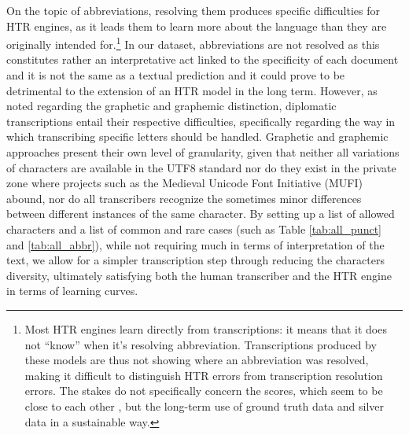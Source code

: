 \documentclass{article}
\begin{document}
On the topic of abbreviations, resolving them produces specific difficulties for HTR engines, as it leads them to learn more about the language than they are originally intended for.\footnote{Most HTR engines learn directly from transcriptions: it means that it does not \enquote{know} when it's resolving abbreviation. Transcriptions produced by these models are thus not showing where an abbreviation was resolved, making it difficult to distinguish HTR errors from transcription resolution errors. The stakes do not specifically concern the scores, which seem to be close to each other \citep{camps2021handling}, but the long-term use of ground truth data and silver data in a sustainable way.} In our dataset, abbreviations are not resolved as this constitutes rather an interpretative act linked to the specificity of each document and it is not the same as a textual prediction and it could prove to be detrimental to the extension of an HTR model in the long term. However, as noted regarding the graphetic and graphemic distinction, diplomatic transcriptions entail their respective difficulties, specifically regarding the way in which transcribing specific letters should be handled. Graphetic and graphemic approaches present their own level of granularity, given that neither all variations of characters are available in the UTF8 standard nor do they exist in the private zone where projects such as the Medieval Unicode Font Initiative (MUFI) abound, nor do all transcribers recognize the sometimes minor differences between different instances of the same character. %
By setting up a list of allowed characters and a list of common and rare cases (such as Table \ref{tab:all_punct} and \ref{tab:all_abbr}), while not requiring much in terms of interpretation of the text, we allow for a simpler transcription step through reducing the characters diversity, ultimately satisfying both the human transcriber and the HTR engine in terms of learning curves.
 
\end{document}
